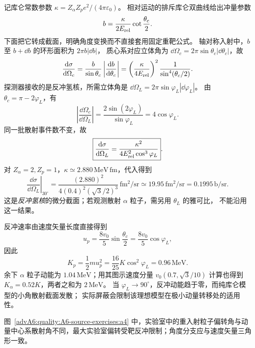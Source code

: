 \begin{advsolution}
记库仑常数参数 $\kappa=Z_\alpha Z_p e^2/(4\pi\varepsilon_0)$。
相对运动的排斥库仑双曲线给出冲量参数
\[
 b=\frac{\kappa}{2E_{\rm rel}}\cot\frac{\theta_c}2.
\]
下面把它转成截面，明确角度变换而不直接套用固定重靶公式。
轴对称入射中，$b$ 至 $b+\dd b$ 的环形面积为 $2\pi b|\dd b|$，
质心系对应立体角为 $\dd\Omega_c=2\pi\sin\theta_c|\dd\theta_c|$，故
\[
 \frac{\mathop{}\!\mathrm d\sigma}{\mathop{}\!\mathrm d\Omega_c}
 =\frac b{\sin\theta_c}\left|\frac{\mathop{}\!\mathrm d b}{\mathop{}\!\mathrm d\theta_c}\right|
 =\left(\frac{\kappa}{4E_{\rm rel}}\right)^2
   \frac1{\sin^4(\theta_c/2)}.
\]
探测器接收的是反冲氢核，所需立体角是
$\dd\Omega_L=2\pi\sin\varphi_L|\dd\varphi_L|$。
由 $\theta_c=\pi-2\varphi_L$，有
\[
 \left|\frac{\dd\Omega_c}{\dd\Omega_L}\right|
 =\frac{2\sin(2\varphi_L)}{\sin\varphi_L}=4\cos\varphi_L.
\]
同一批散射事件数不变，故
\[
 \boxed{\frac{\mathop{}\!\mathrm d\sigma}{\mathop{}\!\mathrm d\Omega_L}
 =\frac{\kappa^2}{4E_{\rm rel}^2\cos^3\varphi_L}}.
\]
对 $Z_\alpha=2,Z_p=1$，$\kappa\simeq2.880\,\mathrm{MeV\,fm}$，代入得到
\[
 \left.\frac{\dd\sigma}{\dd\Omega_L}\right|_{30^\circ}
 =\frac{(2.880)^2}{4(0.4)^2(\sqrt3/2)^3}\,\mathrm{fm^2/sr}
 \simeq19.95\,\mathrm{fm^2/sr}=0.1995\,\mathrm{b/sr}.
\]
这是\emph{反冲氢核}的微分截面；若观测散射 $\alpha$ 粒子，需另用 $\theta_L$ 的雅可比，
不能沿用这一结果。

反冲速率由速度矢量长度直接得到
\[
 u_p=\frac{8v_0}5\sin\frac{\theta_c}2
 =\frac{8v_0}5\cos\varphi_L,
\]
因此
\[
 \boxed{K_p=\frac12mu_p^2
 =\frac{16}{25}K\cos^2\varphi_L=0.96\,\mathrm{MeV}}.
\]
余下 $\alpha$ 粒子动能为 $1.04\,\mathrm{MeV}$；用其图示速度分量
$v_0(0.7,\sqrt3/10)$ 计算也得到 $K_\alpha=0.52K$，两者之和为 $2\,\mathrm{MeV}$。
当 $\varphi_L\to90^\circ$，反冲动能趋于零，而纯库仑模型的小角散射截面发散；
实际屏蔽会限制该理想模型在极小动量转移处的适用性。

图~\ref{advA6:quality:A6-source-exercises:a4} 中，实验室中的重入射粒子偏转角与动量中心系散射角不同，最大实验室偏转受靶反冲限制；角度分支应与速度矢量三角形一致。
\end{advsolution}

